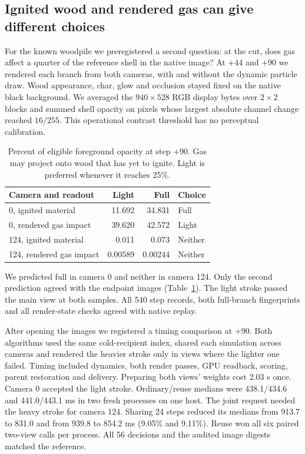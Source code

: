 \documentclass[acmtog,anonymous,review]{acmart}
\begin{document}
\subsection{Ignited wood and rendered gas can give different choices}
For the known woodpile we preregistered a second question: at the cut, does gas affect a quarter of the reference shell in the native image? At $+44$ and $+90$ we rendered each branch from both cameras, with and without the dynamic particle draw. Wood appearance, char, glow and occlusion stayed fixed on the native black background. We averaged the $940\times528$ RGB display bytes over $2\times2$ blocks and summed shell opacity on pixels whose largest absolute channel change reached $16/255$. This operational contrast threshold has no perceptual calibration.

\begin{table}[t]
\caption{Percent of eligible foreground opacity at step $+90$. Gas may project onto wood that has yet to ignite. Light is preferred whenever it reaches 25\%.}
\label{tab:render}
\centering\small
\begin{tabular}{lrrl}\toprule
Camera and readout & Light & Full & Choice\\\midrule
0, ignited material & 11.692 & 34.831 & Full\\
0, rendered gas impact & 39.620 & 42.572 & Light\\
124, ignited material & 0.011 & 0.073 & Neither\\
124, rendered gas impact & 0.00589 & 0.00244 & Neither\\\bottomrule
\end{tabular}
\end{table}

We predicted full in camera 0 and neither in camera 124. Only the second prediction agreed with the endpoint images (Table~\ref{tab:render}). The light stroke passed the main view at both samples. All 540 step records, both full-branch fingerprints and all render-state checks agreed with native replay.

After opening the images we registered a timing comparison at $+90$. Both algorithms used the same cold-recipient index, shared each simulation across cameras and rendered the heavier stroke only in views where the lighter one failed. Timing included dynamics, both render passes, GPU readback, scoring, parent restoration and delivery. Preparing both views' weights cost 2.03 s once. Camera 0 accepted the light stroke. Ordinary/reuse medians were 438.1/434.6 and 441.0/443.1 ms in two fresh processes on one host. The joint request needed the heavy stroke for camera 124. Sharing 24 steps reduced its medians from 913.7 to 831.0 and from 939.8 to 854.2 ms (9.05\% and 9.11\%). Reuse won all six paired two-view calls per process. All 56 decisions and the audited image digests matched the reference.
\end{document}
